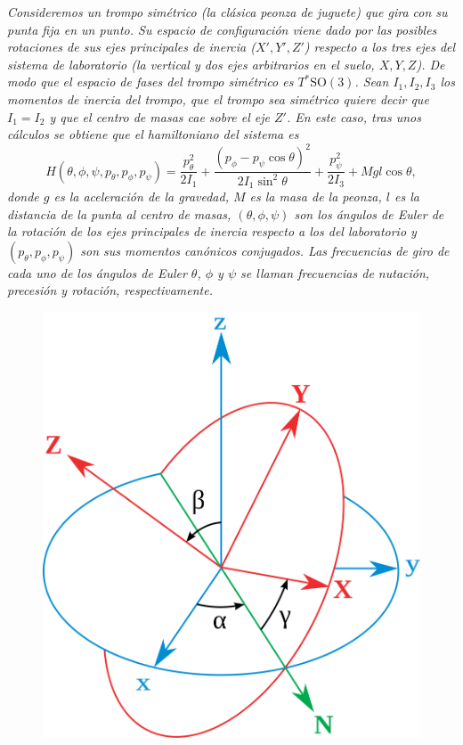 \begin{ejemplo}
  \em
  Consideremos un trompo simétrico (la clásica peonza de juguete) que gira con su punta fija en un punto. Su espacio de configuración viene dado por las posibles rotaciones de sus ejes principales de inercia ($X',Y',Z'$) respecto a los tres ejes del sistema de laboratorio (la vertical y dos ejes arbitrarios en el suelo, $X,Y,Z$). De modo que el espacio de fases del trompo simétrico es $T^*\mathrm{SO}(3)$. Sean $I_1,I_2,I_3$ los momentos de inercia del trompo, que el trompo sea \emph{simétrico} quiere decir que $I_1=I_2$ y que el centro de masas cae sobre el eje $Z'$. En este caso, tras unos cálculos se obtiene que el hamiltoniano del sistema es
  \begin{equation*}
    H(\theta,\phi,\psi,p_{\theta},p_{\phi},p_{\psi})=\frac{p_{\theta}^2}{2I_1}+\frac{(p_{\phi}-p_{\psi}\cos\theta)^2}{2I_1\sin^2\theta}+\frac{p_{\psi}^2}{2I_3}+Mgl\cos \theta,
  \end{equation*}
  donde $g$ es la aceleración de la gravedad, $M$ es la masa de la peonza, $l$ es la distancia de la punta al centro de masas, $(\theta,\phi,\psi)$ son los ángulos de Euler de la rotación de los ejes principales de inercia respecto a los del laboratorio y $(p_{\theta},p_{\phi},p_{\psi})$ son sus momentos canónicos conjugados. 
  Las frecuencias de giro de cada uno de los ángulos de Euler $\theta$, $\phi$ y $\psi$ se llaman frecuencias de \emph{nutación}, \emph{precesión} y \emph{rotación}, respectivamente.
  \begin{figure}[h]
    \label{fig:euler}
    \centering
    \begin{minipage}[b]{0.4\textwidth}
    \includegraphics[width=\textwidth]{pics/euler}

\end{minipage}
\end{figure}
\end{ejemplo}
